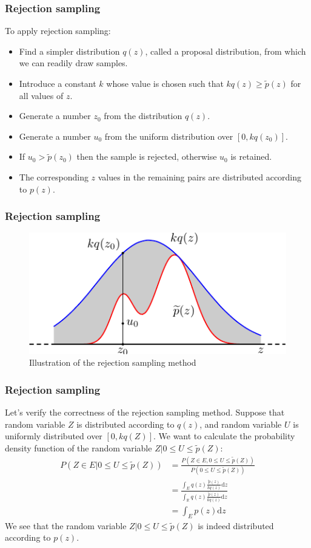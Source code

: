 \documentclass{beamer}
\begin{document}
\begin{frame}
    \frametitle{Rejection sampling}
    To apply rejection sampling:
    \begin{itemize}
        \item Find a simpler distribution $q(z)$, called a proposal distribution, from which we can readily draw samples.
        \item Introduce a constant $k$ whose value is chosen such that $kq(z)\ge\tilde{p}(z)$ for all values of $z$.
        \item Generate a number $z_{0}$ from the distribution $q(z)$.
        \item Generate a number $u_{0}$ from the uniform distribution over $[0,kq(z_{0})]$.
        \item If $u_{0}>\tilde{p}(z_{0})$ then the sample is rejected, otherwise $u_{0}$ is retained.
        \item The corresponding $z$ values in the remaining pairs are distributed according to $p(z)$.
    \end{itemize}
\end{frame}

\begin{frame}
    \frametitle{Rejection sampling}
    \begin{figure}
        \caption{Illustration of the rejection sampling method}
        \includegraphics{Figure_4.pdf}
    \end{figure}
\end{frame}

\begin{frame}
    \frametitle{Rejection sampling}
    Let's verify the correctness of the rejection sampling method. Suppose that random variable $Z$ is distributed according to $q(z)$, and random variable $U$ is uniformly distributed over $[0,kq(Z)]$. We want to calculate the probability density function of the random variable $Z|0\le{}U\le\tilde{p}(Z)$:
    \begin{align*}
        P(Z\in{}E|0\le{}U\le\tilde{p}(Z))&=\frac{P(Z\in{}E,0\le{}U\le\tilde{p}(Z))}{P(0\le{}U\le\tilde{p}(Z))} \\
        &=\frac{\int_{E}q(z)\frac{\tilde{p}(z)}{kq(z)}\mathrm{d}z}{\int_{\mathbb{R}}q(z)\frac{\tilde{p}(z)}{kq(z)}\mathrm{d}z} \\
        &=\int_{E}p(z)\mathrm{d}z
    \end{align*}
    We see that the random variable $Z|0\le{}U\le\tilde{p}(Z)$ is indeed distributed according to $p(z)$.
\end{frame}
\end{document}
